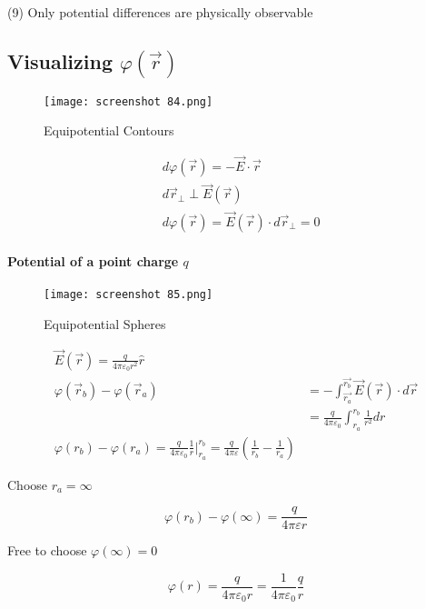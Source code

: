 \documentclass[svgnames]{article}   	%
\begin{document}
(9) \hspace{10px} Only potential differences are physically observable


\subsection{Visualizing $\varphi(\vec{r})$}

\begin{figure}[H]
  \centering
    \texttt{[image: screenshot 84.png]}
    \caption{Equipotential Contours}
\end{figure}




\begin{align*}
  &d\varphi(\vec{r}) = - \vec{E} \cdot \vec{r} \\
  &d\vec{r}_\perp \perp \vec{E}(\vec{r}) \\
  &d\varphi(\vec{r}) = \vec{E}(\vec{r}) \cdot d\vec{r}_\perp = 0 
\end{align*}

\paragraph{Potential of a point charge $q$}

\begin{figure}[H]
  \centering
    \texttt{[image: screenshot 85.png]}
    \caption{Equipotential Spheres}
\end{figure}



\begin{align*}
  \vec{E}(\vec{r}) = \frac{q}{4\pi\varepsilon_0 r^2} \hat{r} \\
  \varphi(\vec{r}_b) - \varphi(\vec{r}_a) &= -\int_{\vec{r_a}}^{\vec{r_b}}
  \vec{E}(\vec{r}) \cdot d\vec{r} \\
                              &= \frac{q}{4\pi\varepsilon_0}\int_{r_a}^{r_b}\frac{1}{r^2}dr \\
  \varphi(r_b) - \varphi(r_a) = \frac{q}{4\pi\varepsilon_0} \frac{1}{r}
  \Big|_{r_a}^{r_b} = \frac{q}{4\pi\varepsilon}\left(\frac{1}{r_b}
    - \frac{1}{r_a} \right)
\end{align*}

Choose $r_a = \infty$ 

\[
  \varphi(r_b) - \varphi(\infty) = \frac{q}{4\pi\varepsilon r}
\]

Free to choose $\varphi(\infty) = 0$ 

\vspace{5px}
\begin{tcolorbox}
  \[
  \varphi(r) = \frac{q}{4\pi\varepsilon_0 r} = \frac{1}{4\pi\varepsilon_0}
  \frac{q}{r}
  \]
\end{tcolorbox}
\vspace{5px}
\end{document}
